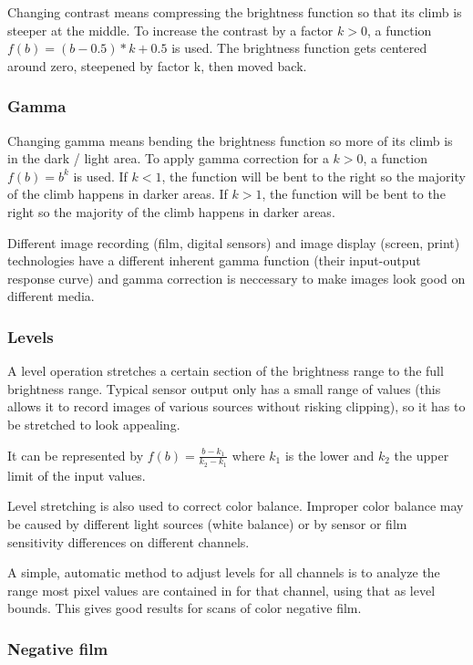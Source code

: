 \documentclass{article}
\begin{document}
Changing contrast means compressing the brightness function so that its climb
is steeper at the middle.
To increase the contrast by a factor $k > 0$, a function $f(b) = (b - 0.5) * k + 0.5$ is used.
The brightness function gets centered around zero, steepened by factor k, then moved
back.

\subsubsection{Gamma}

Changing gamma means bending the brightness function so more of its climb
is in the dark / light area.
To apply gamma correction for a $k > 0$, a function $f(b) = b^k$ is used.
If $k < 1$, the function will be bent to the right so the majority of the climb
happens in darker areas.
If $k > 1$, the function will be bent to the right so the majority of the climb
happens in darker areas.

Different image recording (film, digital sensors) and image display (screen, print)
technologies have a different inherent gamma function (their input-output response curve)
and gamma correction is neccessary to make images look good on different media.

\subsubsection{Levels}

A level operation stretches a certain section of the brightness range to
the full brightness range. Typical sensor output only has a small range of values
(this allows it to record images of various sources without risking clipping),
so it has to be stretched to look appealing.

It can be represented by $f(b) = \frac{b - k_1}{k_2 - k_1}$ where $k_1$ is the lower
and $k_2$ the upper limit of the input values.

Level stretching is also used to correct color balance. Improper color balance may
be caused by different light sources (white balance) or by sensor or film sensitivity
differences on different channels.

A simple, automatic method to adjust levels for all channels is to analyze the range
most pixel values are contained in for that channel, using that as level bounds.
This gives good results for scans of color negative film.

\subsubsection{Negative film}
\end{document}
